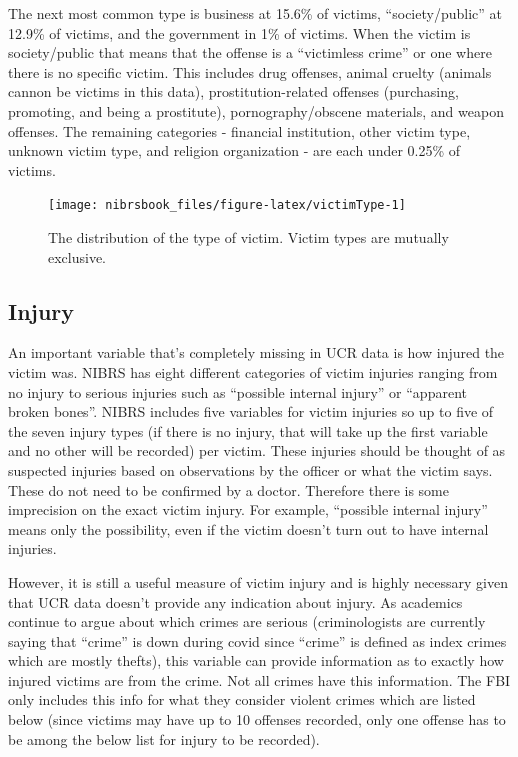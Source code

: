 \documentclass[
  12pt,
  openany]{book}
\begin{document}
The next most common type is business at 15.6\% of victims, ``society/public'' at 12.9\% of victims, and the government in 1\% of victims. When the victim is society/public that means that the offense is a ``victimless crime'' or one where there is no specific victim. This includes drug offenses, animal cruelty (animals cannon be victims in this data), prostitution-related offenses (purchasing, promoting, and being a prostitute), pornography/obscene materials, and weapon offenses. The remaining categories - financial institution, other victim type, unknown victim type, and religion organization - are each under 0.25\% of victims.

\begin{figure}

{\centering \texttt{[image: nibrsbook\_files/figure-latex/victimType-1]} 

}

\caption{The distribution of the type of victim. Victim types are mutually exclusive.}\label{fig:victimType}
\end{figure}

\hypertarget{injury}{%
\subsection{Injury}\label{injury}}

An important variable that's completely missing in UCR data is how injured the victim was. NIBRS has eight different categories of victim injuries ranging from no injury to serious injuries such as ``possible internal injury'' or ``apparent broken bones''. NIBRS includes five variables for victim injuries so up to five of the seven injury types (if there is no injury, that will take up the first variable and no other will be recorded) per victim. These injuries should be thought of as suspected injuries based on observations by the officer or what the victim says. These do not need to be confirmed by a doctor. Therefore there is some imprecision on the exact victim injury. For example, ``possible internal injury'' means only the possibility, even if the victim doesn't turn out to have internal injuries.

However, it is still a useful measure of victim injury and is highly necessary given that UCR data doesn't provide any indication about injury. As academics continue to argue about which crimes are serious (criminologists are currently saying that ``crime'' is down during covid since ``crime'' is defined as index crimes which are mostly thefts), this variable can provide information as to exactly how injured victims are from the crime. Not all crimes have this information. The FBI only includes this info for what they consider violent crimes which are listed below (since victims may have up to 10 offenses recorded, only one offense has to be among the below list for injury to be recorded).
\end{document}
